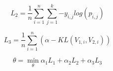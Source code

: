 \begin{equation}\label{eq_st2_2}
L_{2} = \frac{1}{n}{\sum_{i = 1}^{n}{\sum_{j = 1}^{k}{- y_{i,j}log\left( p_{i,j} \right)}}}
\end{equation}

\begin{equation}\label{eq_st2_3}
L_{3} = \frac{1}{n}{\sum_{i = 1}^{n}\left( \alpha - KL\left( V_{1,i},V_{2,i} \right) \right)}
\end{equation}

\begin{equation}\label{eq_st2_4}
\theta = {\min\limits_{\theta}{\alpha_{1}L_{1} +}}\alpha_{2}L_{2} + \alpha_{3}L_{3}
\end{equation}




